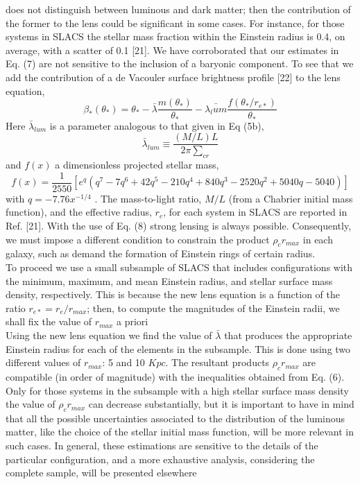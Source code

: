 \documentclass{article}
\begin{document}
\begin{multicols}{2}[]
does not distinguish between luminous and dark matter;
then the contribution of the former to the lens could be
significant in some cases. For instance, for those systems
in SLACS the stellar mass fraction within the Einstein
radius is 0.4, on average, with a scatter of 0.1 [21].
We have corroborated that our estimates in Eq. (7) are
not sensitive to the inclusion of a baryonic component.
To see that we add the contribution of a de Vacouler
surface brightness profile [22] to the lens equation,
\begin{equation}
    \beta_*(\theta_*)=\theta_*-\bar{\lambda}\frac{m(\theta_*)}{\theta_*}-\bar{\lambda_lum}\frac{f(\theta_*/r_{e*})}{\theta_*}
\end{equation}
Here $\bar{\lambda}_{lum}$ is a parameter analogous to that given in Eq (5b),
\begin{equation}
    \bar{\lambda}_{lum}\equiv{\frac{(M/L)L}{2\pi{\sum}_{cr}}} 
\end{equation}
and $f(x)$ a dimensionless projected stellar mass,
\begin{equation}
    f(x)=\frac{1}{2550}[e^q(q^7-7q^6+42q^5-210q^4+840q^3-2520q^2+5040q-5040)]
\end{equation}
with $q=-7.76x^{-1/4}$
. The mass-to-light ratio, $M/L$
(from a Chabrier initial mass function), and the effective radius, $r_e$, for each system in SLACS are reported
in Ref. [21]. With the use of Eq. (8) strong lensing is always possible. Consequently, we must impose a different
condition to constrain the product $\rho_cr_{max}$ in each galaxy, such as demand the formation of Einstein rings of certain radius.
\\To proceed we use a small subsample of SLACS that includes configurations with the minimum, maximum, and
mean Einstein radius, and stellar surface mass density,
respectively. This is because the new lens equation is a
function of the ratio $r_{e*}=r_e/r_{max}$; then, to compute the
magnitudes of the Einstein radii, we shall fix the value of
$r_{max}$ a priori
\\Using the new lens equation we find the value of $\bar{\lambda}$ that
produces the appropriate Einstein radius for each of the
elements in the subsample. This is done using two different values of $r_{max}$: 5 and 10 $Kpc$. The resultant products
$\rho_cr_{max}$ are compatible (in order of magnitude) with the
inequalities obtained from Eq. (6). Only for those systems in the subsample with a high stellar surface mass
density the value of $\rho_cr_{max}$ can decrease substantially,
but it is important to have in mind that all the possible
uncertainties associated to the distribution of the luminous matter, like the choice of the stellar initial mass
function, will be more relevant in such cases. In general, these estimations are sensitive to the details of the
particular configuration, and a more exhaustive analysis, considering the complete sample, will be presented
elsewhere
\end{multicols}
\end{document}
